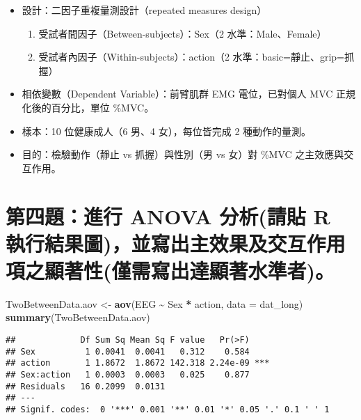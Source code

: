 \documentclass[
  12pt,
]{article}
\newenvironment{Shaded}{\begin{snugshade}}{\end{snugshade}}
\newcommand{\AttributeTok}[1]{\textcolor[rgb]{0.13,0.29,0.53}{#1}}
\newcommand{\FunctionTok}[1]{\textcolor[rgb]{0.13,0.29,0.53}{\textbf{#1}}}
\newcommand{\NormalTok}[1]{#1}
\newcommand{\OtherTok}[1]{\textcolor[rgb]{0.56,0.35,0.01}{#1}}
\newcommand{\SpecialCharTok}[1]{\textcolor[rgb]{0.81,0.36,0.00}{\textbf{#1}}}
\begin{document}
\begin{itemize}
\item
  設計：二因子重複量測設計（repeated measures design）

  \begin{enumerate}
  \def\labelenumi{\arabic{enumi}.}
  \item
    受試者間因子（Between-subjects）：Sex（2 水準：Male、Female）
  \item
    受試者內因子（Within-subjects）：action（2
    水準：basic=靜止、grip=抓握）
  \end{enumerate}
\item
  相依變數（Dependent Variable）：前臂肌群 EMG 電位，已對個人 MVC
  正規化後的百分比，單位 \%MVC。
\item
  樣本：10 位健康成人（6 男、4 女），每位皆完成 2 種動作的量測。
\item
  目的：檢驗動作（靜止 vs 抓握）與性別（男 vs 女）對 \%MVC
  之主效應與交互作用。
\end{itemize}

\section{第四題：進行 ANOVA 分析(請貼 R
執行結果圖)，並寫出主效果及交互作用項之顯著性(僅需寫出達顯著水準者)。}\label{ux7b2cux56dbux984cux9032ux884c-anova-ux5206ux6790ux8acbux8cbc-r-ux57f7ux884cux7d50ux679cux5716ux4e26ux5bebux51faux4e3bux6548ux679cux53caux4ea4ux4e92ux4f5cux7528ux9805ux4e4bux986fux8457ux6027ux50c5ux9700ux5bebux51faux9054ux986fux8457ux6c34ux6e96ux8005}

\begin{Shaded}
\begin{Highlighting}[]
\NormalTok{TwoBetweenData.aov }\OtherTok{\textless{}{-}} \FunctionTok{aov}\NormalTok{(EEG }\SpecialCharTok{\textasciitilde{}}\NormalTok{ Sex }\SpecialCharTok{*}\NormalTok{ action, }\AttributeTok{data =}\NormalTok{ dat\_long)}
\FunctionTok{summary}\NormalTok{(TwoBetweenData.aov)}
\end{Highlighting}
\end{Shaded}

\begin{verbatim}
##             Df Sum Sq Mean Sq F value   Pr(>F)    
## Sex          1 0.0041  0.0041   0.312    0.584    
## action       1 1.8672  1.8672 142.318 2.24e-09 ***
## Sex:action   1 0.0003  0.0003   0.025    0.877    
## Residuals   16 0.2099  0.0131                     
## ---
## Signif. codes:  0 '***' 0.001 '**' 0.01 '*' 0.05 '.' 0.1 ' ' 1
\end{verbatim}
\end{document}
